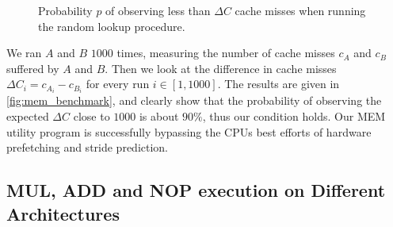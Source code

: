 \begin{figure}
    \centering
    \caption{Probability \(p\) of observing less than \(\Delta C\) cache misses when running the random lookup procedure.}
    \label{fig:mem_benchmark}
\end{figure}



We ran \(A\) and \(B\) \(1000\) times, measuring the number of cache misses \(c_A\) and \(c_B\) suffered by \(A\) and \(B\).
Then we look at the difference in cache misses \(\Delta C_i = c_{A_i} - c_{B_i}\) for every run \(i \in [1, 1000]\). 
The results are given in \autoref{fig:mem_benchmark}, and clearly show that the probability of observing the expected \(\Delta C\) close to \(1000\) is about \(90\%\), thus our condition holds.
Our MEM utility program is successfully bypassing the CPUs best efforts of hardware prefetching and stride prediction.

\subsection{MUL, ADD and NOP execution on Different Architectures}
\label{subsec:MUL_ADD_NOP_instructions}

